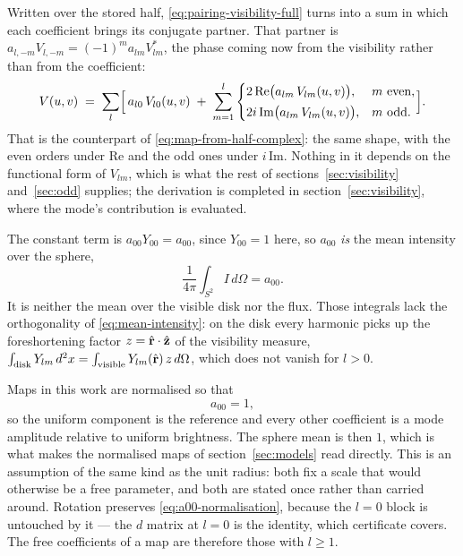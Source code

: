 Written over the stored half, \eqref{eq:pairing-visibility-full} turns into a sum in which each
coefficient brings its conjugate partner.  That partner is
$a_{l,-m}V_{l,-m} = (-1)^ma_{lm}V_{lm}^*$, the phase coming now from the visibility
rather than from the coefficient:
\begin{equation}
  V(u,v) \;=\; \sum_{l}\Bigl[\, a_{l0}\,V_{l0}(u,v)
    \;+\; \sum_{m=1}^{l}
      \begin{cases}
        2\,\mathrm{Re}\bigl( a_{lm}\,V_{lm}(u,v) \bigr) , & m \text{ even},\\[2pt]
        2i\,\mathrm{Im}\bigl( a_{lm}\,V_{lm}(u,v) \bigr) , & m \text{ odd}.
      \end{cases}
  \Bigr] .
  \label{eq:pairing-visibility-parity}
\end{equation}
That is the counterpart of \eqref{eq:map-from-half-complex}: the same shape, with the even orders
under $\mathrm{Re}$ and the odd ones under $i\,\mathrm{Im}$.  Nothing in it depends on the
functional form of $V_{lm}$, which is what the rest of sections~\ref{sec:visibility}
and~\ref{sec:odd} supplies; the derivation is completed in
section~\ref{sec:visibility}, where the mode's contribution is evaluated.

The constant term is $a_{00}Y_{00} = a_{00}$, since $Y_{00} = 1$ here, so $a_{00}$ \emph{is}
the mean intensity over the sphere,
\begin{equation}
  \frac{1}{4\pi}\int_{S^2} I \, d\Omega = a_{00} .
  \label{eq:mean-intensity}
\end{equation}
It is neither the mean over the visible disk nor the flux.  Those integrals lack
the orthogonality of \eqref{eq:mean-intensity}: on the disk every harmonic picks up
the foreshortening factor $z = \hat{\mathbf r}\cdot\hat{\mathbf z}$ of the visibility measure,
$\int_{\rm disk} Y_{lm} \, d^2x = \int_{\rm visible} Y_{lm}(\hat{\mathbf r})\, z \, d\Omega$,
which does not vanish for $l > 0$.

Maps in this work are normalised so that
\begin{equation}
  a_{00} = 1 ,
  \label{eq:a00-normalisation}
\end{equation}
so the uniform component is the reference and every other coefficient is a mode
amplitude relative to uniform brightness.  The sphere mean is then $1$, which is what makes
the normalised maps of section~\ref{sec:models} read directly.  This is an assumption of the same kind as the unit radius: both
fix a scale that would otherwise be a free parameter, and both are stated once
rather than carried around.  Rotation preserves \eqref{eq:a00-normalisation},
because the $l = 0$ block is untouched by it --- the $d$ matrix at $l = 0$ is the
identity, which certificate  covers.  The free coefficients of a map are
therefore those with $l \ge 1$.

